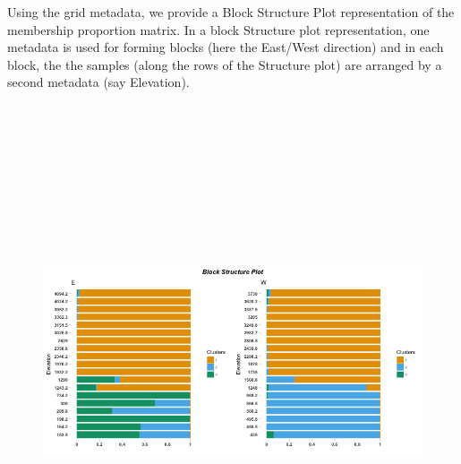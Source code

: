 \documentclass[12pt]{article}
\begin{document}
Using the grid metadata, we provide a Block Structure Plot representation of the membership proportion matrix. In a block Structure plot representation, one metadata is used for forming blocks (here the East/West direction) and in each block, the
the samples (along the rows of the Structure plot) are arranged by a second metadata (say Elevation).

\begin{knitrout}
\color{fgcolor}\begin{kframe}
\begin{alltt}
  
                
                \hlstd{=} \hlstd{,}
                \hlstd{=} \hlstd{)}
\end{alltt}
\end{kframe}
\end{knitrout}


\begin{figure}[htp]
\begin{center}
\includegraphics[width=6in,height=6in]{figure/block_structure.png}
\end{center}
\end{figure}
\end{document}
